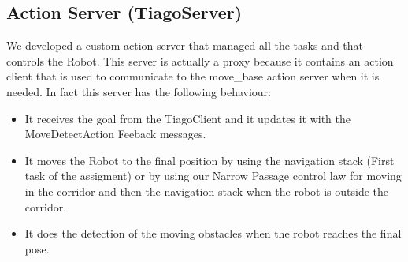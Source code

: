 \subsection{Action Server (TiagoServer)}
We developed a custom action server that managed all the tasks and that controls the Robot. This server is actually a proxy because it contains an action client that is used to communicate to the move\_base action server when it is needed. In fact this server has the following behaviour: 
\begin{itemize}
    \item It receives the goal from the TiagoClient and it updates it with the MoveDetectAction Feeback messages. 
    \item It moves the Robot to the final position by using the navigation stack (First task of the assigment) or by using our Narrow Passage control law for moving in the corridor and then the navigation stack when the robot is outside the corridor.
    \item It does the detection of the moving obstacles when the robot reaches the final pose. 
\end{itemize}
